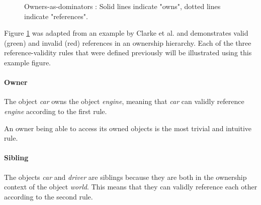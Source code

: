 \documentclass[sigplan,11pt,nonacm]{acmart}
\begin{document}
\begin{figure}

  \caption{Owners-as-dominators \cite{flexible-alias-protection}: Solid lines indicate "owns", dotted lines indicate "references".}
  \label{fig:owners-as-dominators}
\end{figure}

Figure \ref{fig:owners-as-dominators} was adapted from an example by Clarke et al. \cite{flexible-alias-protection} and demonstrates valid (green) and invalid (red) references in an ownership hierarchy.
Each of the three reference-validity rules that were defined previously will be illustrated using this example figure.


\paragraph{Owner}

The object \emph{car} owns the object \emph{engine}, meaning that \emph{car} can validly reference \emph{engine} according to the first rule.

An owner being able to access its owned objects is the most trivial and intuitive rule.


\paragraph{Sibling}

The objects \emph{car} and \emph{driver} are siblings because they are both in the ownership context of the object \emph{world}.
This means that they can validly reference each other according to the second rule.
\end{document}
